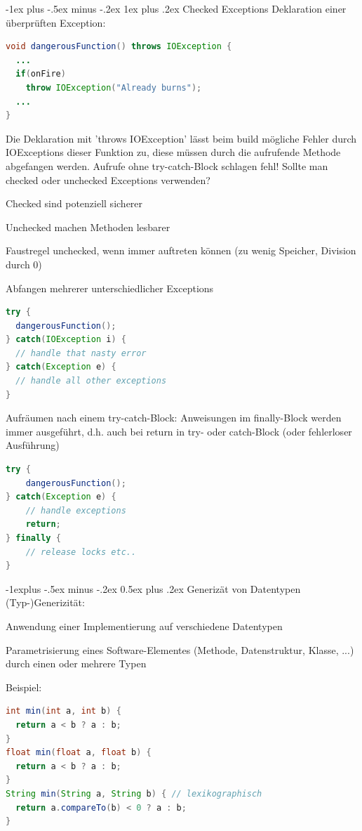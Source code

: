 \documentclass[10pt]{article}
\makeatletter
\renewcommand{\subsection}{\@startsection{subsection}{2}{0mm}%
                                {-1explus -.5ex minus -.2ex}%
                                {0.5ex plus .2ex}%
                                {\normalfont\normalsize\bfseries}}
\renewcommand{\subsubsection}{\@startsection{subsubsection}{3}{0mm}%
                                {-1ex plus -.5ex minus -.2ex}%
                                {1ex plus .2ex}%
                                {\normalfont\small\bfseries}}
\makeatother
\begin{document}
\subsubsection{Checked Exceptions}
Deklaration einer überprüften Exception:
\begin{lstlisting}[language=java]
void dangerousFunction() throws IOException {
  ...
  if(onFire)
    throw IOException("Already burns");
  ...
}
\end{lstlisting}

Die Deklaration mit 'throws IOException' lässt beim build mögliche Fehler durch IOExceptions dieser Funktion zu, diese müssen durch die aufrufende Methode abgefangen werden.
Aufrufe ohne try-catch-Block schlagen fehl!
Sollte man checked oder unchecked Exceptions verwenden?
\begin{itemize*}
  \item Checked sind potenziell sicherer
  \item Unchecked machen Methoden lesbarer
  \item Faustregel unchecked, wenn immer auftreten können (zu wenig Speicher, Division durch 0)
\end{itemize*}

Abfangen mehrerer unterschiedlicher Exceptions
\begin{lstlisting}[language=java]
try {
  dangerousFunction();
} catch(IOException i) {
  // handle that nasty error
} catch(Exception e) {
  // handle all other exceptions
}
\end{lstlisting}

Aufräumen nach einem try-catch-Block: Anweisungen im finally-Block werden immer ausgeführt, d.h. auch bei
return in try- oder catch-Block (oder fehlerloser Ausführung)
\begin{lstlisting}[language=java]
try {
    dangerousFunction();
} catch(Exception e) {
    // handle exceptions
    return;
} finally {
    // release locks etc..
}
\end{lstlisting}

\subsection{Generizät von Datentypen}
(Typ-)Generizität:
\begin{itemize*}
  \item Anwendung einer Implementierung auf verschiedene Datentypen
  \item Parametrisierung eines Software-Elementes (Methode, Datenstruktur, Klasse, ...) durch einen oder mehrere Typen
\end{itemize*}
Beispiel:
\begin{lstlisting}[language=java]
int min(int a, int b) {
  return a < b ? a : b;
}
float min(float a, float b) {
  return a < b ? a : b;
}
String min(String a, String b) { // lexikographisch
  return a.compareTo(b) < 0 ? a : b;
}
\end{lstlisting}
\end{document}
